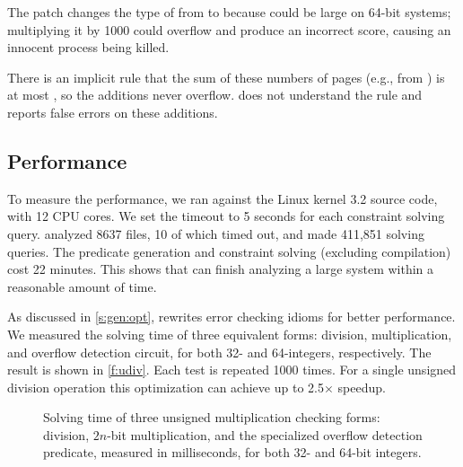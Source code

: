 The patch changes the type of  from  to  because
 could be large on 64-bit systems; multiplying it by
1000 could overflow and produce an incorrect score,
causing an innocent process being killed.

There is an implicit rule that the sum of these numbers of pages
(e.g., from ) is at most , so the
additions never overflow.  \sys does not understand the rule and
reports false errors on these additions.


\subsection{Performance}
\label{s:eval:perf}

To measure the performance, we ran \sys against the Linux kernel
3.2 source code, with 12 CPU cores.  We set the timeout
to 5 seconds for each constraint solving query.   \sys analyzed
8637 files, 10 of which timed out, and made 411,851 solving queries.
The predicate generation and constraint solving (excluding compilation)
cost 22 minutes.  This shows that \sys can finish analyzing a large
system within a reasonable amount of time.

As discussed in \autoref{s:gen:opt}, \sys rewrites error checking
idioms for better performance.  We measured the solving time of three
equivalent forms: division, multiplication, and overflow detection
circuit, for both 32- and 64-integers, respectively.  The result
is shown in \autoref{f:udiv}.  Each test is repeated 1000 times.
For a single unsigned division operation this optimization can
achieve up to 2.5$\times$ speedup.

\begin{figure}
\centering

\caption{Solving time of three unsigned multiplication checking forms:
division, $2n$-bit multiplication, and the specialized overflow
detection predicate, measured in milliseconds, for both 32- and 64-bit
integers.}
\label{f:udiv}
\end{figure}
